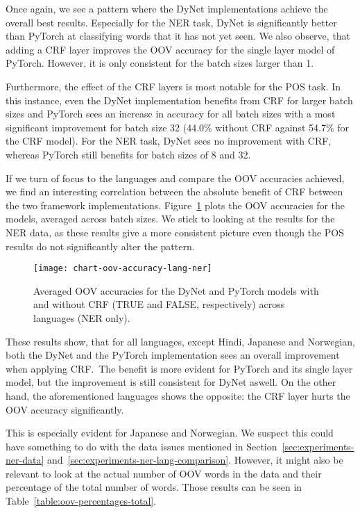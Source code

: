 Once again, we see a pattern where the DyNet implementations achieve the
overall best results. Especially for the NER task, DyNet is significantly better
than PyTorch at classifying words that it has not yet seen. We also observe,
that adding a CRF layer improves the OOV accuracy for the single layer model of
PyTorch. However, it is only consistent for the batch sizes larger than 1.

Furthermore, the effect of the CRF layers is most notable for the POS task.
In this instance, even the DyNet implementation benefits from CRF for larger
batch sizes and PyTorch sees an increase in accuracy for all batch sizes with a
most significant improvement for batch size 32 (44.0\% without CRF against
54.7\% for the CRF model). For the NER task, DyNet sees no improvement with
CRF, whereas PyTorch still benefits for batch sizes of 8 and 32.

If we turn of focus to the languages and compare the OOV accuracies achieved, we
find an interesting correlation between the absolute benefit of CRF between the
two framework implementations. Figure~\ref{chart:oov-accuracy-lang-ner} plots
the OOV accuracies for the models, averaged across batch sizes. We stick to
looking at the results for the NER data, as these results give a more consistent
picture even though the POS results do not significantly alter the pattern.

\begin{figure}[h!]
    \texttt{[image: chart-oov-accuracy-lang-ner]}
    \caption{Averaged OOV accuracies for the DyNet and PyTorch models with and
        without CRF (TRUE and FALSE, respectively) across languages (NER only).
    }\label{chart:oov-accuracy-lang-ner}
\end{figure}

These results show, that for all languages, except Hindi, Japanese and
Norwegian, both the DyNet and the PyTorch implementation sees an overall
improvement when applying CRF.\ The benefit is more evident for PyTorch and its
single layer model, but the improvement is still consistent for DyNet aswell. On
the other hand, the aforementioned languages shows the opposite: the CRF layer
hurts the OOV accuracy significantly.

This is especially evident for Japanese and Norwegian. We suspect this could
have something to do with the data issues mentioned in
Section~\ref{sec:experiments-ner-data}
and~\ref{sec:experiments-ner-lang-comparison}. However, it might also be
relevant to look at the actual number of OOV words in the data and their
percentage of the total number of words. Those results can be seen in
Table~\ref{table:oov-percentages-total}.

